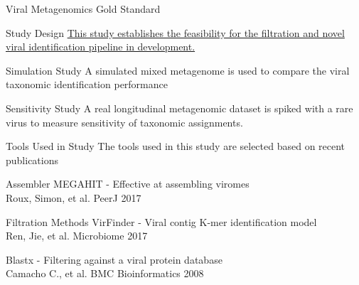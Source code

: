 \documentclass[11pt]{beamer}
\begin{document}
	\begin{frame}{Viral Metagenomics Gold Standard} 
	
	
	\end{frame}
	
	\begin{frame}{Study Design}
	\hyperlink{https://github.com/glickmac/Novel_Viral_Discovery}{This study establishes the feasibility for the filtration and novel viral identification pipeline in development.}
	
	\begin{block}{Simulation Study}
	A simulated mixed metagenome is used to compare the viral taxonomic identification performance
	\end{block}
	
	\begin{block}{Sensitivity Study}
	A real longitudinal metagenomic dataset is spiked with a rare virus to measure sensitivity of taxonomic assignments. 
	\end{block}
	
	\end{frame}
	
	
	\begin{frame}{Tools Used in Study}
	The tools used in this study are selected based on recent publications
	\begin{block}{Assembler}
	MEGAHIT - Effective at assembling viromes \\
	\tiny{Roux, Simon, et al. PeerJ 2017}
	\end{block}
	
	\begin{block}{Filtration Methods}
	VirFinder - Viral contig K-mer identification model \\ 
	\tiny{Ren, Jie, et al. Microbiome 2017}
	
	\large{Blastx - Filtering against a viral protein database} \\
	\tiny{Camacho C., et al. BMC Bioinformatics 2008}
	\end{block}
	
	\end{frame}
	
\end{document}
